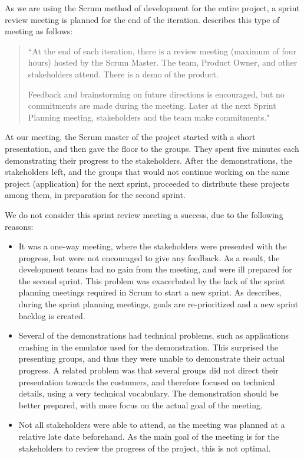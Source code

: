 As we are using the Scrum method of development for the entire \giraf project, a sprint review meeting is planned for the end of the iteration. 
\citet[p. 71]{larmanAgile} describes this type of meeting as follows:
\begin{quote}
``At the end of each iteration, there is a review meeting (maximum of four hours)
hosted by the Scrum Master.
The team, Product Owner, and other stakeholders attend.
There is a demo of the product.

Feedback and brainstorming on future directions is encouraged, but no commitments are made during the meeting.
Later at the next Sprint Planning meeting, stakeholders and the team make commitments."
\end{quote}

At our meeting, the Scrum master of the \giraf project started with a short presentation, and then gave the floor to the groups. 
They spent five minutes each demonstrating their progress to the stakeholders. 
After the demonstrations, the stakeholders left, and the groups that would not continue working on the same project (\giraf application) for the next sprint, proceeded to distribute these projects among them, in preparation for the second sprint.

We do not consider this sprint review meeting a success, due to the following reasons:
\begin{itemize}
	\item It was a one-way meeting, where the stakeholders were presented with the progress, but were not encouraged to give any feedback. 
	As a result, the development teams had no gain from the meeting, and were ill prepared for the second sprint. 
	This problem was exacerbated by the lack of the sprint planning meetings required in Scrum to start a new sprint.
	As \citet[p. 70]{larmanAgile} describes, during the sprint planning meetings, goals are re-prioritized and a new sprint backlog is created. 
	\item Several of the demonstrations had technical problems, such as applications crashing in the emulator used for the demonstration.
	This surprised the presenting groups, and thus they were unable to demonstrate their actual progress.
	A related problem was that several groups did not direct their presentation towards the costumers, and therefore focused on technical details, using a very technical vocabulary.
	The demonstration should be better prepared, with more focus on the actual goal of the meeting.
	\item Not all stakeholders were able to attend, as the meeting was planned at a relative late date beforehand.
	As the main goal of the meeting is for the stakeholders to review the progress of the project, this is not optimal.
\end{itemize}

